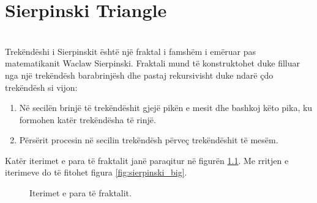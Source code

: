 \chapter{Sierpinski Triangle}

\noindent \\ Trekëndëshi i Sierpinskit është një fraktal i famshëm i emëruar pas matematikanit Waclaw Sierpinski. Fraktali mund të konstruktohet duke filluar nga një trekëndësh barabrinjësh dhe pastaj rekursivisht duke ndarë çdo trekëndësh si vijon:

\begin{enumerate}
    \item Në secilën brinjë të trekëndëshit gjejë pikën e mesit dhe bashkoj këto pika, ku formohen katër trekëndësha të rinjë.
    \item Përsërit procesin në secilin trekëndësh përveç trekëndëshit të mesëm.
\end{enumerate}

\noindent Katër iterimet e para të fraktalit janë paraqitur në figurën \ref{fig:sierpinski_iterations}. Me rritjen e iterimeve do të fitohet figura \ref{fig:sierpinski_big}.

\begin{figure}[htbp]
\hfill
{}
\hfill
{}
\hfill
{}
\hfill
{}
\hfill
\caption{Iterimet e para të fraktalit.}
\label{fig:sierpinski_iterations}
\end{figure}


